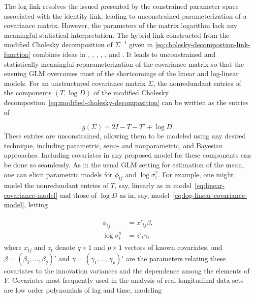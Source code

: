 The log link resolves the issued presented by the constrained parameter space associated with the identity link, leading to unconstrained parameterization of a covariance matrix. However, the parameters of the matrix logarithm lack any meaningful statistical interpretation. The hybrid link  constructed from the modified Cholesky decomposition of $\Sigma^{-1}$ given in \ref{eq:cholesky-decompostion-link-function} combines ideas in \cite{edgeworth1892xxii}, \cite{gabriel1962ante}, \cite{anderson1973asymptotically}, \cite{dempster1972covariance}, \cite{chiu1996matrix}, and \cite{zimmerman1997structured}. It leads to unconstrained and statistically meaningful reparameterization of the covariance matrix so that the ensuing GLM overcomes most of the shortcomings of the linear and log-linear models.  For an unstructured covariance matrix $\Sigma$, the nonredundant entries of the components $\left(T, \log D\right)$ of the modified Cholesky decompostion~\ref{eq:modified-cholesky-decomposition} can be written as the entries of 

\begin{equation}\label{eq:cholesky-decompostion-link-function}
g\left( \Sigma \right) = 2I - T - T' + \log D.
\end{equation}
\noindent
These entries are unconstrained, allowing them to be modeled using any desired technique, including parametric, semi- and nonparametric, and Bayesian approaches. Including covariates in any proposed model for these components can be done so seamlessly. As in the usual GLM setting for estimation of the mean, one can elicit parametric models for $\phi_{tj}$ and $\log\sigma_t^2$.  For example, one might model the nonredundant entries of $T$, say, linearly as in model~\ref{eq:linear-covariance-model} and those of $\log D$ as in, say, model~\ref{eq:log-linear-covariance-model}, letting

\begin{align}
\begin{split} \label{eq:linear-models-for-GARPs-IVs}
\phi_{tj} &= x'_{tj} \beta,\\
\log\sigma_t^2 &= z'_t \gamma,
\end{split}
\end{align}
\noindent
where $x_{tj}$ and $z_{t}$ denote $q \times 1$ and $p \times 1$ vectors of known covariates, and $\beta = \left(\beta_1,\dots, \beta_q \right)'$ and $\gamma = \left(\gamma_1,\dots, \gamma_p \right)'$ are the parameters relating these covariates to the innovation variances and the dependence among the elements of $Y$. Covariates most frequently used in the analysis of real longitudinal data sets are low order polynomials of lag and time, modeling

